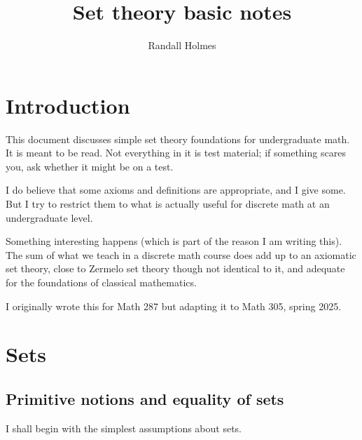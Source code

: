 \documentclass[12pt]{article}
\title{Set theory basic notes}
\author{Randall Holmes}
\begin{document}
\maketitle

\tableofcontents

\section{Introduction}

This document discusses simple set theory foundations for undergraduate math.  It is meant to be read.  Not everything in it is test material;  if something scares you, ask whether it might be on a test.

I do believe that some axioms and definitions are appropriate, and I give some.  But I try to restrict them to what is actually useful for discrete math at an undergraduate level.

Something interesting happens (which is part of the reason I am writing this).  The sum of what we teach in a discrete math course does add up to an axiomatic set theory, close to Zermelo set theory though not identical to it, and adequate for the foundations of classical mathematics.

I originally wrote this for Math 287 but adapting it to Math 305, spring 2025.



\newpage
\section{Sets}

\subsection{Primitive notions and equality of sets}

I shall begin with the simplest assumptions about sets.
\end{document}
